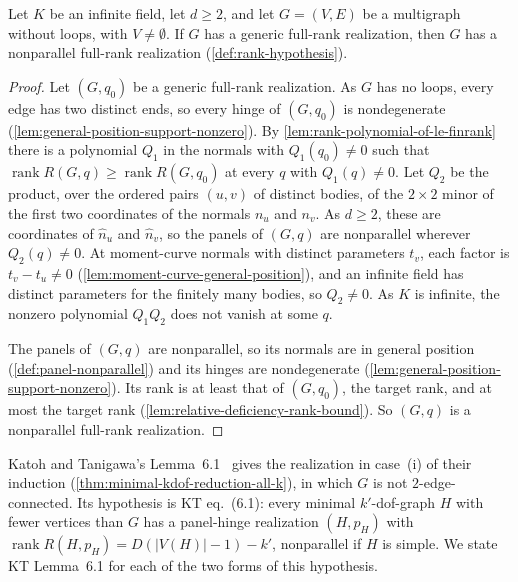 \begin{lemma}
  \label{lem:nonparallel-of-generic}
  \leanok
  Let $K$ be an infinite field, let $d \ge 2$, and let $G = (V, E)$ be a
  multigraph without loops, with $V \neq \emptyset$. If $G$ has a
  generic full-rank realization, then $G$ has a nonparallel full-rank
  realization (\cref{def:rank-hypothesis}).
\end{lemma}
\begin{proof}
  \leanok
  Let $(G, q_0)$ be a generic full-rank realization. As $G$ has no
  loops, every edge has two distinct ends, so every hinge of $(G, q_0)$
  is nondegenerate (\cref{lem:general-position-support-nonzero}). By
  \cref{lem:rank-polynomial-of-le-finrank} there is a polynomial $Q_1$ in
  the normals with $Q_1(q_0) \neq 0$ such that
  $\operatorname{rank} R(G,q) \ge \operatorname{rank} R(G,q_0)$ at every
  $q$ with $Q_1(q) \neq 0$. Let $Q_2$ be the product, over the ordered
  pairs $(u, v)$ of distinct bodies, of the $2 \times 2$ minor of the
  first two coordinates of the normals $n_u$ and $n_v$. As $d \ge 2$,
  these are coordinates of $\hat n_u$ and $\hat n_v$, so the panels of
  $(G, q)$ are nonparallel wherever $Q_2(q) \neq 0$. At moment-curve
  normals with distinct parameters $t_v$, each factor is
  $t_v - t_u \neq 0$ (\cref{lem:moment-curve-general-position}), and an
  infinite field has distinct parameters for the finitely many bodies, so
  $Q_2 \neq 0$. As $K$ is infinite, the nonzero polynomial $Q_1 Q_2$ does
  not vanish at some $q$.

  The panels of $(G, q)$ are nonparallel, so its normals are in general
  position (\cref{def:panel-nonparallel}) and its hinges are
  nondegenerate (\cref{lem:general-position-support-nonzero}). Its rank
  is at least that of $(G, q_0)$, the target rank, and at most the
  target rank (\cref{lem:relative-deficiency-rank-bound}). So $(G, q)$ is
  a nonparallel full-rank realization.
\end{proof}

Katoh and Tanigawa's Lemma~6.1~\cite[p.~672]{katohTanigawa2011} gives
the realization in case~(i) of their induction
(\cref{thm:minimal-kdof-reduction-all-k}), in which $G$ is not
$2$-edge-connected. Its hypothesis is KT eq.~(6.1): every minimal
$k'$-dof-graph $H$ with fewer vertices than $G$ has a panel-hinge
realization $(H, p_H)$ with
$\operatorname{rank} R(H, p_H) = D(|V(H)| - 1) - k'$, nonparallel if $H$
is simple. We state KT Lemma~6.1 for each of the two forms of this
hypothesis.

